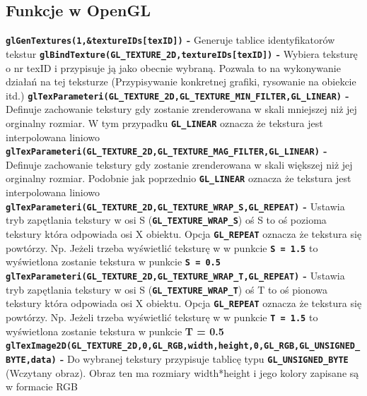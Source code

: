 \documentclass{article}
\begin{document}
        \subsection{Funkcje w OpenGL}
            \raggedright
            \large{\textbf{\texttt{glGenTextures(1,\&textureIDs[texID])} - }} Generuje tablice 
            identyfikatorów tekstur\linebreak 
            \large{\textbf{\texttt{glBindTexture(GL\_TEXTURE\_2D,textureIDs[texID])} - }}Wybiera teksturę 
            o nr texID i przypisuje ją jako obecnie wybraną. Pozwala to na wykonywanie działań na
            tej teksturze (Przypisywanie konkretnej grafiki, rysowanie na obiekcie itd.)\linebreak 
            \large{\textbf{\texttt{glTexParameteri(GL\_TEXTURE\_2D,GL\_TEXTURE\_MIN\_FILTER,GL\_LINEAR)} - }}
            Definuje zachowanie tekstury gdy zostanie zrenderowana w skali mniejszej niż jej orginalny
            rozmiar. W tym przypadku \textbf{\texttt{GL\_LINEAR}} oznacza że tekstura jest interpolowana liniowo\linebreak 
            \large{\textbf{\texttt{glTexParameteri(GL\_TEXTURE\_2D,GL\_TEXTURE\_MAG\_FILTER,GL\_LINEAR)} - }}
            Definuje zachowanie tekstury gdy zostanie zrenderowana w skali większej niż jej orginalny
            rozmiar. Podobnie jak poprzednio \textbf{\texttt{GL\_LINEAR}} oznacza że tekstura jest interpolowana 
            liniowo\linebreak 
            \large{\textbf{\texttt{glTexParameteri(GL\_TEXTURE\_2D,GL\_TEXTURE\_WRAP\_S,GL\_REPEAT)} - }} 
            Ustawia tryb zapętlania tekstury w osi S (\textbf{\texttt{GL\_TEXTURE\_WRAP\_S}}) oś S to oś pozioma
            tekstury która odpowiada osi X obiektu. Opcja \textbf{\texttt{GL\_REPEAT}} oznacza że tekstura się 
            powtórzy. Np. Jeżeli trzeba wyświetlić teksturę w w punkcie \textbf{\texttt{S = 1.5}} to wyświetlona zostanie 
            tekstura w punkcie \textbf{\texttt{S = 0.5}} \linebreak 
            \large{\textbf{\texttt{glTexParameteri(GL\_TEXTURE\_2D,GL\_TEXTURE\_WRAP\_T,GL\_REPEAT)} - }} 
            Ustawia tryb zapętlania tekstury w osi S (\textbf{\texttt{GL\_TEXTURE\_WRAP\_T}}) oś T to oś pionowa
            tekstury która odpowiada osi X obiektu. Opcja \textbf{\texttt{GL\_REPEAT}} oznacza że tekstura się 
            powtórzy. Np. Jeżeli trzeba wyświetlić teksturę w w punkcie \textbf{\texttt{T = 1.5}} to wyświetlona zostanie 
            tekstura w punkcie \textbf{T = 0.5} \linebreak 
            \large{\textbf{\texttt{glTexImage2D(GL\_TEXTURE\_2D,0,GL\_RGB,width,height,0,GL\_RGB,GL\_UNSIGNED\_BYTE,data)} - }}
            Do wybranej tekstury przypisuje tablicę typu \textbf{\texttt{GL\_UNSIGNED\_BYTE}} (Wczytany obraz).
            Obraz ten ma rozmiary width*height i jego kolory zapisane są w formacie RGB\linebreak 
\end{document}
